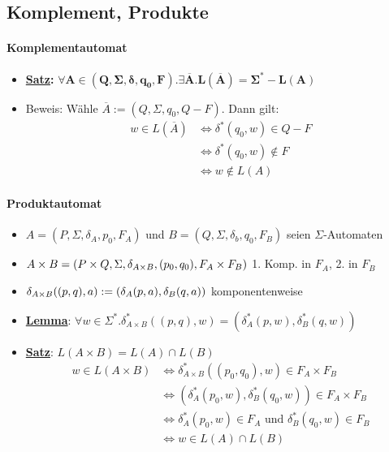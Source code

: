 \documentclass{scrartcl}
\begin{document}
\subsection{Komplement, Produkte}

\paragraph{Komplementautomat}

\begin{itemize}
	\item \textbf{\underline{Satz}:} $\mathbf{\forall A \in (Q, \Sigma, \delta, q_0, F). \exists \overline{A}. L(\overline{A}) = \Sigma^* - L(A)}$
	\item Beweis: Wähle $\overline{A} := (Q,\Sigma,q_0, Q-F)$. Dann gilt:
	\begin{align*}
		w \in L(\overline{A}) &\iff \delta^*(q_0,w) \in Q-F \\
		&\iff \delta^*(q_0,w) \not \in F \\
		&\iff w \not \in L(A)
	\end{align*}
\end{itemize}

\paragraph{Produktautomat}

\begin{itemize}
	\item $A = (P, \Sigma, \delta_A, p_0, F_A)$ und $B = (Q, \Sigma, \delta_b, q_0, F_B)$ seien $\Sigma$-Automaten
	\item $A \times B = (P \times Q, \Sigma, \delta_{A \times B}, (p_0,q_0), F_A \times F_B) \hfill$ 1. Komp. in $F_A$, 2. in $F_B$
	\item $\delta_{A \times B}((p,q),a) := (\delta_A(p,a), \delta_B(q,a)) \hfill$ komponentenweise
	\item \textbf{\underline{Lemma}}: $\forall w \in \Sigma^*. \delta^*_{A \times B}((p,q),w) = (\delta_A^*(p,w), \delta_B^*(q,w))$
	\item \textbf{\underline{Satz}}: $L(A \times B) = L(A) \cap L(B)$
	\begin{align*}
		w \in L(A \times B) & \iff \delta_{A \times B}^*((p_0,q_0),w) \in F_A \times F_B \\
		&\iff (\delta_A^*(p_0,w), \delta_B^*(q_0,w)) \in F_A \times F_B \\
		&\iff \delta_A^*(p_0,w) \in F_A \text{ und } \delta_B^*(q_0,w) \in F_B \\
		&\iff w \in L(A) \cap L(B)
	\end{align*}
\end{itemize}
\end{document}
